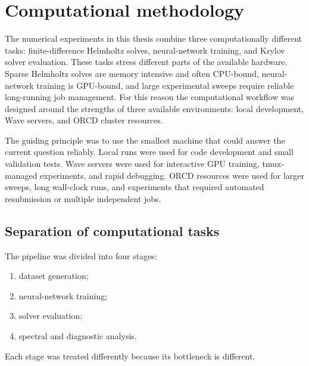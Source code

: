 %
%

\section{Computational methodology}
\label{sec:methodology_computational}

The numerical experiments in this thesis combine three computationally
different tasks: finite-difference Helmholtz solves, neural-network training,
and Krylov solver evaluation. These tasks stress different parts of the
available hardware. Sparse Helmholtz solves are memory intensive and often
CPU-bound, neural-network training is GPU-bound, and large experimental
sweeps require reliable long-running job management. For this reason the
computational workflow was designed around the strengths of three available
environments: local development, Wave servers, and ORCD cluster resources.

The guiding principle was to use the smallest machine that could answer the
current question reliably. Local runs were used for code development and
small validation tests. Wave servers were used for interactive GPU training,
tmux-managed experiments, and rapid debugging. ORCD resources were used for
larger sweeps, long wall-clock runs, and experiments that required automated
resubmission or multiple independent jobs.


\subsection{Separation of computational tasks}
\label{subsec:computational_task_separation}

The pipeline was divided into four stages:
\begin{enumerate}
    \item dataset generation;
    \item neural-network training;
    \item solver evaluation;
    \item spectral and diagnostic analysis.
\end{enumerate}
Each stage was treated differently because its bottleneck is different.

